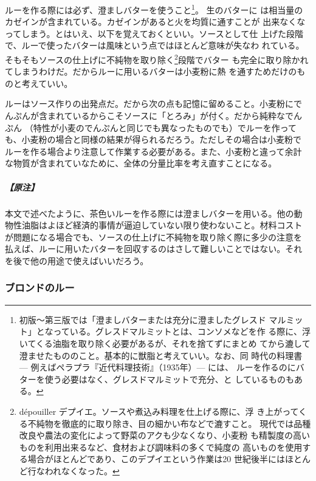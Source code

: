\begin{recette}
ルーを作る際には必ず、澄ましバターを使うこと\footnote{初版〜第三版では「澄ましバターまたは充分に澄ましたグレスド
  マルミット」となっている。グレスドマルミットとは、コンソメなどを作
  る際に、浮いてくる油脂を取り除く必要があるが、それを捨てずにまとめ
  てから漉して澄ませたもののこと。基本的に獣脂と考えていい。なお、同
  時代の料理書 --- 例えばペラプラ『近代料理技術』（1935年）--- には、
  ルーを作るのにバターを使う必要はなく、グレスドマルミットで充分、と
  しているものもある。}。 生のバターに
は相当量のカゼインが含まれている。カゼインがあると火を均質に通すことが
出来なくなってしまう。とはいえ、以下を覚えておくといい。ソースとして仕
上げた段階で、ルーで使ったバターは風味という点ではほとんど意味が失なわ
れている。そもそもソースの仕上げに不純物を取り除く\footnote{dépouiller
  デプイエ。ソースや煮込み料理を仕上げる際に、浮
  き上がってくる不純物を徹底的に取り除き、目の細かい布などで漉すこと。
  現代では品種改良や農法の変化によって野菜のアクも少なくなり、小麦粉
  も精製度の高いものを利用出来るなど、食材および調味料の多くで純度の
  高いものを使用する場合がほとんどであり、このデプイエという作業は20
  世紀後半にはほとんど行なわれなくなった。}段階でバター
も完全に取り除かれてしまうわけだ。だからルーに用いるバターは小麦粉に熱
を通すためだけのものと考えていい。

ルーはソース作りの出発点だ。だから次の点も記憶に留めること。小麦粉にで
んぷんが含まれているからこそソースに「とろみ」が付く。だから純粋なでん
ぷん （特性が小麦のでんぷんと同じでも異なったものでも）でルーを作って
も、小麦粉の場合と同様の結果が得られるだろう。ただしその場合は小麦粉で
ルーを作る場合より注意して作業する必要がある。また、小麦粉と違って余計
な物質が含まれていなために、全体の分量比率を考え直すことになる。

\hypertarget{ux539fux6ce8-6}{%
\subparagraph{【原注】}\label{ux539fux6ce8-6}}

本文で述べたように、茶色いルーを作る際には澄ましバターを用いる。他の動
物性油脂はよほど経済的事情が逼迫していない限り使わないこと。材料コスト
が問題になる場合でも、ソースの仕上げに不純物を取り除く際に多少の注意を
払えば、ルーに用いたバターを回収するのはさして難しいことではない。それ
を後で他の用途で使えばいいだろう。

\maeaki

\hypertarget{roux-blond}{%
\subsubsection{ブロンドのルー}\label{roux-blond}}

\hypertarget{roux-blond-1}{%
}
\end{recette}
